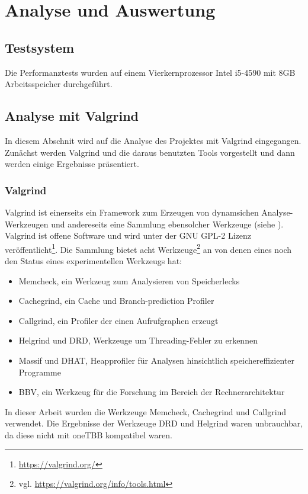 \chapter{Analyse und Auswertung}\label{analysis}


\section{Testsystem}

Die Performanztests wurden auf einem Vierkernprozessor Intel i5-4590 mit 8GB Arbeitsspeicher durchgeführt.


\section{Analyse mit Valgrind}

In diesem Abschnit wird auf die Analyse des Projektes mit Valgrind eingegangen. Zunächst werden Valgrind und die daraus benutzten Tools vorgestellt und dann werden einige Ergebnisse präsentiert.
\subsection{Valgrind}

Valgrind ist einerseits ein Framework zum Erzeugen von dynamsichen Analyse-Werkzeugen und andereseits eine Sammlung ebensolcher Werkzeuge (siehe \cite{10.1145/1250734.1250746}). 
Valgrind ist offene Software und wird unter der GNU GPL-2 Lizenz veröffentlicht\footnote{\url{https://valgrind.org/}}.
Die Sammlung bietet acht Werkzeuge\footnote{vgl. \url{https://valgrind.org/info/tools.html}} an von denen eines noch den Status eines experimentellen Werkzeugs hat:
\begin{itemize}
  \item Memcheck, ein Werkzeug zum Analysieren von Speicherlecks
  \item Cachegrind, ein Cache und Branch-prediction Profiler
  \item Callgrind, ein Profiler der einen Aufrufgraphen erzeugt
  \item Helgrind und DRD, Werkzeuge um Threading-Fehler zu erkennen
  \item Massif und DHAT, Heapprofiler für Analysen hinsichtlich speichereffizienter Programme 
  \item BBV, ein Werkzeug für die Forschung im Bereich der Rechnerarchitektur
\end{itemize}

In dieser Arbeit wurden die Werkzeuge Memcheck, Cachegrind und Callgrind verwendet. Die Ergebnisse der Werkzeuge DRD und Helgrind waren unbrauchbar, da diese nicht mit oneTBB kompatibel waren.

